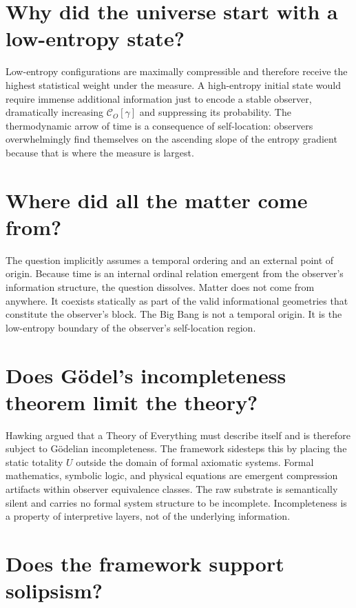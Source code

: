 \section{Why did the universe start with a low-entropy state?}

Low-entropy configurations are maximally compressible and therefore
receive the highest statistical weight under the measure. A high-entropy
initial state would require immense additional information just to encode
a stable observer, dramatically increasing $\mathcal{C}_O[\gamma]$ and
suppressing its probability. The thermodynamic arrow of time is a
consequence of self-location: observers overwhelmingly find themselves
on the ascending slope of the entropy gradient because that is where
the measure is largest.


\section{Where did all the matter come from?}

The question implicitly assumes a temporal ordering and an external
point of origin. Because time is an internal ordinal relation emergent
from the observer's information structure, the question dissolves. Matter
does not come from anywhere. It coexists statically as part of the valid
informational geometries that constitute the observer's block. The Big
Bang is not a temporal origin. It is the low-entropy boundary of the
observer's self-location region.


\section{Does Gödel's incompleteness theorem limit the theory?}

Hawking argued that a Theory of Everything must describe itself and is
therefore subject to Gödelian incompleteness. The framework sidesteps
this by placing the static totality $U$ outside the domain of formal
axiomatic systems. Formal mathematics, symbolic logic, and physical
equations are emergent compression artifacts within observer equivalence
classes. The raw substrate is semantically silent and carries no formal
system structure to be incomplete. Incompleteness is a property of
interpretive layers, not of the underlying information.

\section{Does the framework support solipsism?}

